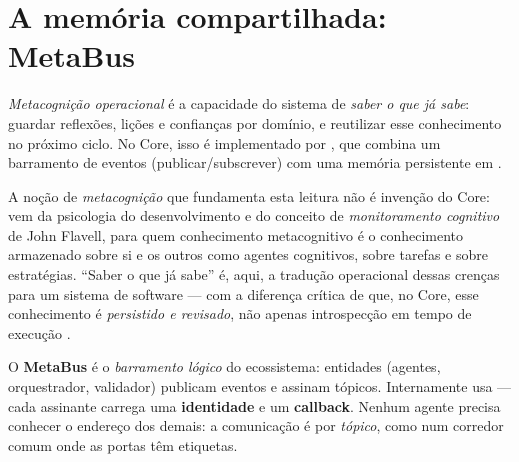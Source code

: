 \section{A memória compartilhada: MetaBus}

\begin{conceito}
\emph{Metacognição operacional} é a capacidade do sistema de \emph{saber o que já
sabe}: guardar reflexões, lições e confianças por domínio, e reutilizar esse
conhecimento no próximo ciclo. No Core, isso é implementado por ,
que combina um barramento de eventos (publicar/subscrever) com uma memória
persistente em .
\end{conceito}

\par\smallskip
A noção de \emph{metacognição} que fundamenta esta leitura não é invenção do
Core: vem da psicologia do desenvolvimento e do conceito de
\emph{monitoramento cognitivo} de John Flavell, para quem conhecimento
metacognitivo é o conhecimento armazenado sobre si e os outros como agentes
cognitivos, sobre tarefas e sobre estratégias. ``Saber o que já sabe'' é, aqui,
a tradução operacional dessas crenças para um sistema de software — com a
diferença crítica de que, no Core, esse conhecimento é \emph{persistido e
revisado}, não apenas introspecção em tempo de execução .

\begin{funcao}
O \textbf{MetaBus} é o \emph{barramento lógico} do ecossistema: entidades
(agentes, orquestrador, validador) publicam eventos e assinam tópicos.
Internamente usa  — cada assinante carrega uma
\textbf{identidade} e um \textbf{callback}. Nenhum agente precisa conhecer o
endereço dos demais: a comunicação é por \emph{tópico}, como num corredor
comum onde as portas têm etiquetas.
\end{funcao}

